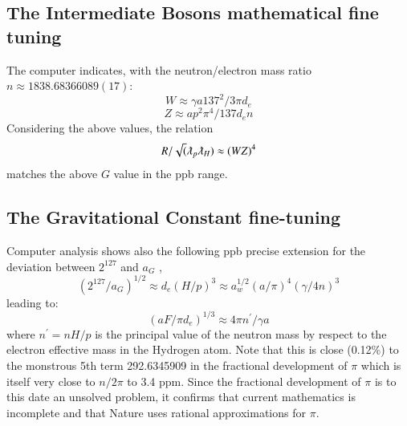\documentclass[twoside,draft]{article}
\begin{document}
\begin{sloppypar}
{\subsection {The Intermediate Bosons mathematical fine tuning}

The computer indicates, with the neutron/electron mass ratio $n \approx 1838.68366089(17)$:
\begin{equation}
W \approx \gamma a 137^{2} / 3\pi d_{e}
\end{equation}
\begin{equation}
Z \approx ap^{2} \pi^{4} / 137 d_{e} n
\end{equation}
Considering the above values, the relation
\begin{equation}
R/\sqrt(\lambdabar_{p} \lambdabar_{H} ) \approx (WZ)^{4}
\end{equation}
matches the above $G$ value in the ppb range.

\subsection {The Gravitational Constant fine-tuning}

Computer analysis shows also the following ppb precise extension for the deviation between $2^{127}$ and
$a_{G}$ ,
\begin{equation}
(2^{127} / a_{G})^{1/2} \approx d_{e} (H/p)^{3} \approx a_{w}^{1/2} (a/\pi)^{4} ( \gamma/4n)^{3}
\end{equation}
leading to:
\begin{equation}
(aF /\pi d_{e})^{1/3} \approx 4\pi n^{\prime}/ \gamma a
\end{equation}
where $n^{\prime} = nH/p$ is the principal value of the neutron mass by respect to the electron effective mass
in the Hydrogen atom. Note that this is close (0.12\%) to the monstrous 5th term 292.6345909 in
the fractional development of $\pi$ which is itself very close to $n/2\pi$ to 3.4 ppm. Since the fractional
development of $\pi$ is to this date an unsolved problem, it confirms that current mathematics is
incomplete and that Nature uses rational approximations for $\pi$.

}
\end{sloppypar}
\end{document}
